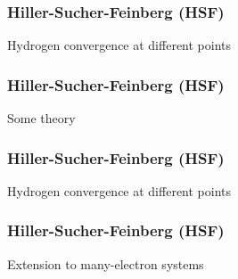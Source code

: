 \begin{frame}
\frametitle{Hiller-Sucher-Feinberg (HSF)}
\scriptsize
Hydrogen convergence at different points

\end{frame}

\begin{frame}
\frametitle{Hiller-Sucher-Feinberg (HSF)}
\scriptsize
Some theory

\end{frame}

\begin{frame}
\frametitle{Hiller-Sucher-Feinberg (HSF)}
\scriptsize
Hydrogen convergence at different points

\end{frame}

\begin{frame}
\frametitle{Hiller-Sucher-Feinberg (HSF)}
\scriptsize
Extension to many-electron systems

\end{frame}
